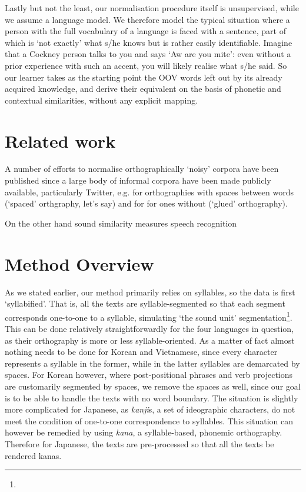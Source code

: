 \documentclass[11pt]{article}
\begin{document}
Lastly but not the least, our normalisation procedure itself is unsupervised, while we assume a language model. We therefore model the typical situation where a person with the full vocabulary of a language is faced with a sentence, part of which is `not exactly' what s/he knows but is rather easily identifiable. Imagine that a Cockney person talks to you and says `Aw are you mite': even without a prior experience with such an accent, you will likely realise what s/he said. So our learner takes as the starting point the OOV words left out by its already acquired knowledge, and derive their equivalent on the basis of phonetic and contextual similarities, without any explicit mapping. %


\section{Related work}

A number of efforts to normalise orthographically `noisy' corpora have been published since a large body of informal corpora have been made publicly available, particularly Twitter, e.g. for orthographies with spaces between words (`spaced' orthgraphy, let's say)  \cite{HanBaldwin11} and for  \cite{Saito14}  for ones without (`glued' orthography). 

On the other hand sound similarity measures   speech recognition


\section{Method Overview}

As we stated earlier, our method primarily relies on syllables, so the data is first `syllabified'. That is, all the texts are syllable-segmented so that each segment corresponds one-to-one to a syllable, simulating `the sound unit' segmentation\footnote{}. This can be done relatively straightforwardly for the four languages in question, as their orthography is more or less syllable-oriented. As a matter of fact almost nothing needs to be done for Korean and Vietnamese, since every character represents a syllable in the former, while in the latter syllables are demarcated by spaces. For Korean however, where post-positional phrases and verb projections are customarily segmented by spaces, we remove the spaces as well, since our goal is to be able to handle the texts with no word boundary. The situation is slightly more complicated for Japanese, as \emph{kanji}s, a set of ideographic characters, do not meet the condition of one-to-one correspondence to syllables. This situation can however be remedied by using \emph{kana}, a syllable-based, phonemic orthography. Therefore for Japanese, the texts are pre-processed so that all the texts be rendered kanas.
\end{document}

